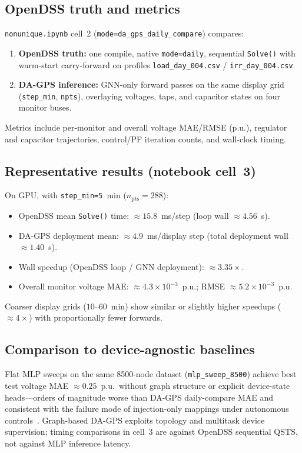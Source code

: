 \documentclass[11pt,a4paper]{article}
\begin{document}
\subsection{OpenDSS truth and metrics}

\texttt{nonunique.ipynb} cell~2 (\texttt{mode=da\_gps\_daily\_compare}) compares:
\begin{enumerate}
  \item \textbf{OpenDSS truth:} one compile, native \texttt{mode=daily}, sequential
        \texttt{Solve()} with warm-start carry-forward on profiles
        \texttt{load\_day\_004.csv} / \texttt{irr\_day\_004.csv}.
  \item \textbf{DA-GPS inference:} GNN-only forward passes on the same display
        grid (\texttt{step\_min}, \texttt{npts}), overlaying voltages, taps, and
        capacitor states on four monitor buses.
\end{enumerate}
Metrics include per-monitor and overall voltage MAE/RMSE (p.u.), regulator and
capacitor trajectories, control/PF iteration counts, and wall-clock timing.

\subsection{Representative results (notebook cell~3)}

On GPU, with \texttt{step\_min=5}~min ($n_{\mathrm{pts}}=288$):
\begin{itemize}
  \item OpenDSS mean \texttt{Solve()} time: $\approx 15.8$~ms/step (loop wall
        $\approx 4.56$~s).
  \item DA-GPS deployment mean: $\approx 4.9$~ms/display step (total deployment
        wall $\approx 1.40$~s).
  \item Wall speedup (OpenDSS loop / GNN deployment): $\approx 3.35\times$.
  \item Overall monitor voltage MAE: $\approx 4.3\times 10^{-3}$~p.u.; RMSE
        $\approx 5.2\times 10^{-3}$~p.u.
\end{itemize}
Coarser display grids ($10$--$60$~min) show similar or slightly higher speedups
($\approx 4\times$) with proportionally fewer forwards.

\subsection{Comparison to device-agnostic baselines}

Flat MLP sweeps on the same 8500-node dataset (\texttt{mlp\_sweep\_8500}) achieve
best test voltage MAE $\approx 0.25$~p.u.\ without graph structure or explicit
device-state heads---orders of magnitude worse than DA-GPS daily-compare MAE and
consistent with the failure mode of injection-only mappings under autonomous
controls~\cite{deboever2017qsts}.  Graph-based DA-GPS exploits topology and
multitask device supervision; timing comparisons in cell~3 are against OpenDSS
sequential QSTS, not against MLP inference latency.
\end{document}
